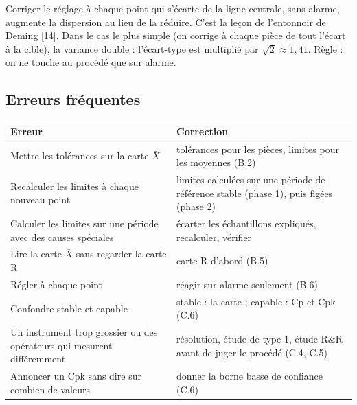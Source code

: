 \documentclass[11pt,a4paper]{article}
\begin{document}
\begin{attention}
Corriger le réglage à chaque point qui s'écarte de la ligne centrale, sans alarme, augmente la dispersion au lieu de la réduire. C'est la leçon de l'entonnoir de Deming [14]. Dans le cas le plus simple (on corrige à chaque pièce de tout l'écart à la cible), la variance double : l'écart-type est multiplié par $\sqrt2 \approx 1{,}41$. Règle : on ne touche au procédé que sur alarme.
\end{attention}

\subsection{Erreurs fréquentes}
\begin{center}\small
\begin{tabularx}{\textwidth}{@{}XX@{}}\toprule
\textbf{Erreur} & \textbf{Correction}\\\midrule
Mettre les tolérances sur la carte $\bar X$ & tolérances pour les pièces, limites pour les moyennes (B.2)\\
Recalculer les limites à chaque nouveau point & limites calculées sur une période de référence stable (phase 1), puis figées (phase 2)\\
Calculer les limites sur une période avec des causes spéciales & écarter les échantillons expliqués, recalculer, vérifier\\
Lire la carte $\bar X$ sans regarder la carte R & carte R d'abord (B.5)\\
Régler à chaque point & réagir sur alarme seulement (B.6)\\
Confondre stable et capable & stable : la carte ; capable : Cp et Cpk (C.6)\\
Un instrument trop grossier ou des opérateurs qui mesurent différemment & résolution, étude de type 1, étude R\&R avant de juger le procédé (C.4, C.5)\\
Annoncer un Cpk sans dire sur combien de valeurs & donner la borne basse de confiance (C.6)\\\bottomrule
\end{tabularx}
\end{center}
\end{document}
